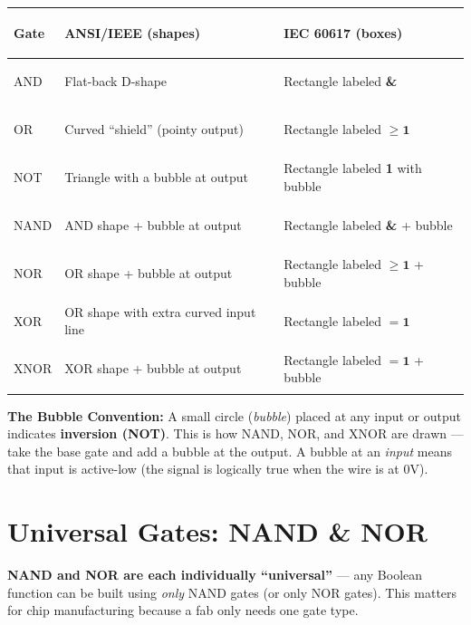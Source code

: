 \documentclass[11pt, letterpaper]{article}
\begin{document}
\noindent
{\renewcommand{\arraystretch}{1.6}
\begin{tabularx}{\textwidth}{>{\bfseries\raggedright\arraybackslash}p{2cm}
                              >{\raggedright\arraybackslash}X
                              >{\raggedright\arraybackslash}X}
\toprule
\rowcolor{tableheaderorange}
\textbf{Gate} & \textbf{ANSI/IEEE (shapes)} & \textbf{IEC 60617 (boxes)} \\
\midrule
\rowcolor{rowOr} AND  & Flat-back D-shape & Rectangle labeled \textbf{\&} \\
\rowcolor{rowA}  OR   & Curved ``shield'' (pointy output) & Rectangle labeled $\geq\mathbf{1}$ \\
\rowcolor{rowOr} NOT  & Triangle with a bubble at output & Rectangle labeled \textbf{1} with bubble \\
\rowcolor{rowA}  NAND & AND shape + bubble at output & Rectangle labeled \textbf{\&} + bubble \\
\rowcolor{rowOr} NOR  & OR shape + bubble at output & Rectangle labeled $\geq\mathbf{1}$ + bubble \\
\rowcolor{rowA}  XOR  & OR shape with extra curved input line & Rectangle labeled $=\mathbf{1}$ \\
\rowcolor{rowOr} XNOR & XOR shape + bubble at output & Rectangle labeled $=\mathbf{1}$ + bubble \\
\bottomrule
\end{tabularx}}

\vspace{4pt}
\begin{tcolorbox}[colback=part4bg, colframe=sectionorange, arc=3pt, boxrule=1pt]
\textbf{The Bubble Convention:} A small circle (\emph{bubble}) placed at any input or output indicates \textbf{inversion (NOT)}. This is how NAND, NOR, and XNOR are drawn --- take the base gate and add a bubble at the output. A bubble at an \emph{input} means that input is active-low (the signal is logically true when the wire is at 0V).
\end{tcolorbox}

\section*{Universal Gates: NAND \& NOR}

\textbf{NAND and NOR are each individually ``universal''} --- any Boolean function can be built using \emph{only} NAND gates (or only NOR gates). This matters for chip manufacturing because a fab only needs one gate type.
\end{document}
